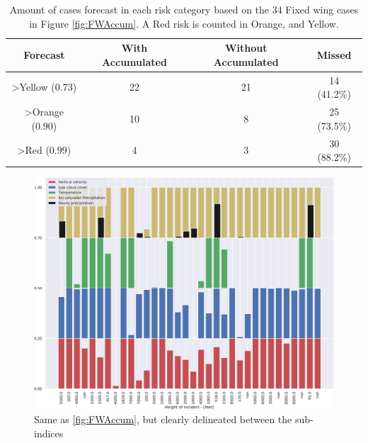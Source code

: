 \begin{table}[H]
    \centering
    \begin{tabular}{c|c|c|c}
        Forecast & With Accumulated & Without Accumulated & Missed \\ \hline
        >Yellow (0.73) & 22 & 21 & 14 (41.2\%)\\
        >Orange (0.90) & 10& 8& 25 (73.5\%)\\ 
        >Red (0.99) & 4& 3& 30 (88.2\%)\\
    \end{tabular}
    \caption{Amount of cases forecast in each risk category based on the $34$ Fixed wing cases in Figure \ref{fig:FWAccum}. A Red risk is counted in Orange, and Yellow.}    \label{tab:FWCont}
\end{table}

\begin{figure}[H]
    \centering
    \includegraphics[width=\textwidth]{Figures/FWDecomp.pdf}
    \caption{Same as \ref{fig:FWAccum}, but clearly delineated between the sub-indices}
    \label{fig:FWDecomp}
\end{figure}
